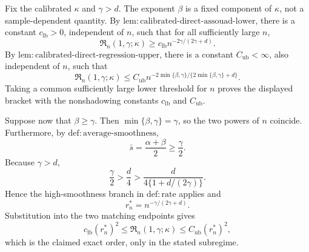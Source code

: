 Fix the calibrated \(\kappa\) and \(\gamma>d\). The exponent \(\beta\) is a fixed component of \(\kappa\), not a sample-dependent quantity. By \(\mathrm{lem:calibrated\text{-}direct\text{-}assouad\text{-}lower}\), there is a constant \(c_{\mathrm{lb}}>0\), independent of \(n\), such that for all sufficiently large \(n\),
\[
\mathfrak R_n(1,\gamma;\kappa)\ge c_{\mathrm{lb}}n^{-2\gamma/(2\gamma+d)}.
\]
By \(\mathrm{lem:calibrated\text{-}direct\text{-}regression\text{-}upper}\), there is a constant \(C_{\mathrm{ub}}<\infty\), also independent of \(n\), such that
\[
\mathfrak R_n(1,\gamma;\kappa)
\le C_{\mathrm{ub}}n^{-2\min\{\beta,\gamma\}/\{2\min\{\beta,\gamma\}+d\}}.
\]
Taking a common sufficiently large lower threshold for \(n\) proves the displayed bracket with the nonshadowing constants \(c_{\mathrm{lb}}\) and \(C_{\mathrm{ub}}\).

Suppose now that \(\beta\ge\gamma\). Then \(\min\{\beta,\gamma\}=\gamma\), so the two powers of \(n\) coincide. Furthermore, by \(\mathrm{def:average\text{-}smoothness}\),
\[
\bar s=\frac{\alpha+\beta}{2}\ge\frac\gamma2.
\]
Because \(\gamma>d\),
\[
\frac\gamma2>\frac d4>
\frac{d}{4\{1+d/(2\gamma)\}}.
\]
Hence the high-smoothness branch in \(\mathrm{def:rate}\) applies and
\[
r_n^*=n^{-\gamma/(2\gamma+d)}.
\]
Substitution into the two matching endpoints gives
\[
c_{\mathrm{lb}}(r_n^*)^2
\le\mathfrak R_n(1,\gamma;\kappa)
\le C_{\mathrm{ub}}(r_n^*)^2,
\]
which is the claimed exact order, only in the stated subregime.